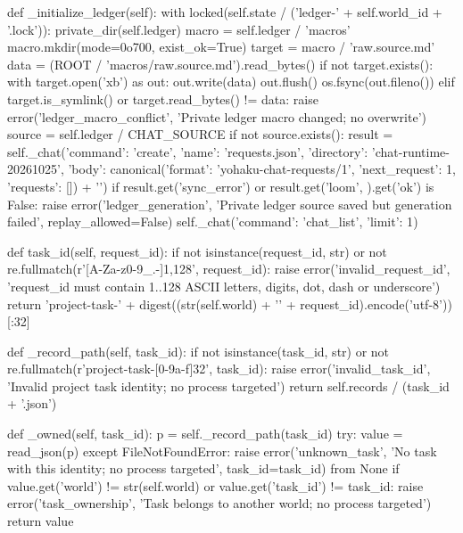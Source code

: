     def _initialize_ledger(self):
        with locked(self.state / ('ledger-' + self.world_id + '.lock')):
            private_dir(self.ledger)
            macro = self.ledger / 'macros'
            macro.mkdir(mode=0o700, exist_ok=True)
            target = macro / 'raw.source.md'
            data = (ROOT / 'macros/raw.source.md').read_bytes()
            if not target.exists():
                with target.open('xb') as out:
                    out.write(data)
                    out.flush()
                    os.fsync(out.fileno())
            elif target.is_symlink() or target.read_bytes() != data:
                raise error('ledger_macro_conflict', 'Private ledger macro changed; no overwrite')
            source = self.ledger / CHAT_SOURCE
            if not source.exists():
                result = self._chat({'command': 'create', 'name': 'requests.json',
                                     'directory': 'chat-runtime-20261025',
                                     'body': canonical({'format': 'yohaku-chat-requests/1', 'next_request': 1, 'requests': []}) + '\n'})
                if result.get('sync_error') or result.get('loom', {}).get('ok') is False:
                    raise error('ledger_generation', 'Private ledger source saved but generation failed', replay_allowed=False)
            self._chat({'command': 'chat_list', 'limit': 1})

    def task_id(self, request_id):
        if not isinstance(request_id, str) or not re.fullmatch(r'[A-Za-z0-9_.-]{1,128}', request_id):
            raise error('invalid_request_id', 'request_id must contain 1..128 ASCII letters, digits, dot, dash or underscore')
        return 'project-task-' + digest((str(self.world) + '\0' + request_id).encode('utf-8'))[:32]

    def _record_path(self, task_id):
        if not isinstance(task_id, str) or not re.fullmatch(r'project-task-[0-9a-f]{32}', task_id):
            raise error('invalid_task_id', 'Invalid project task identity; no process targeted')
        return self.records / (task_id + '.json')

    def _owned(self, task_id):
        p = self._record_path(task_id)
        try:
            value = read_json(p)
        except FileNotFoundError:
            raise error('unknown_task', 'No task with this identity; no process targeted', task_id=task_id) from None
        if value.get('world') != str(self.world) or value.get('task_id') != task_id:
            raise error('task_ownership', 'Task belongs to another world; no process targeted')
        return value

